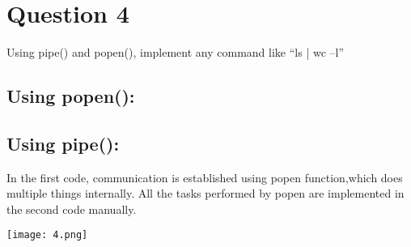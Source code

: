 \documentclass[main.tex]{subfiles}
\begin{document}
\section{Question 4}

Using pipe() and popen(), implement any command like “ls | wc –l”

\subsection{Using popen():}

\subsection{Using pipe():}


In the first code, communication is established using popen function,which does
multiple things internally. All the tasks performed by popen are implemented in 
the second code manually.

\centering\texttt{[image: 4.png]}
\clearpage
\end{document}
